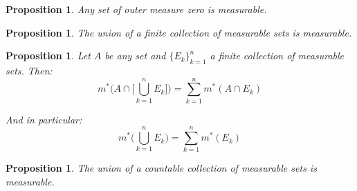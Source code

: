 \documentclass[11pt]{article}
\newtheorem{proposition}[theorem]{Proposition}
\begin{document}
\setcounter{theorem}{3}
\begin{proposition}
    Any set of outer measure zero is measurable.
\end{proposition}

\begin{proposition}
    The union of a finite collection of measurable sets is measurable.
\end{proposition}

\begin{proposition}
    Let $A$ be any set and $\{E_k\}_{k=1}^n$ a finite collection of measurable sets. Then:
    \[
        m^*\Bigg( A \cap \Bigg[\bigcup_{k=1}^n E_k\Bigg] \Bigg) = \sum_{k=1}^n m^*(A \cap E_k)
    \]

    And in particular:
    \[
        m^*\Bigg(\bigcup_{k=1}^n E_k \Bigg) = \sum_{k=1}^n m^*(E_k)
    \]
\end{proposition}

\begin{proposition}
    The union of a countable collection of measurable sets is measurable.
\end{proposition}
\end{document}
